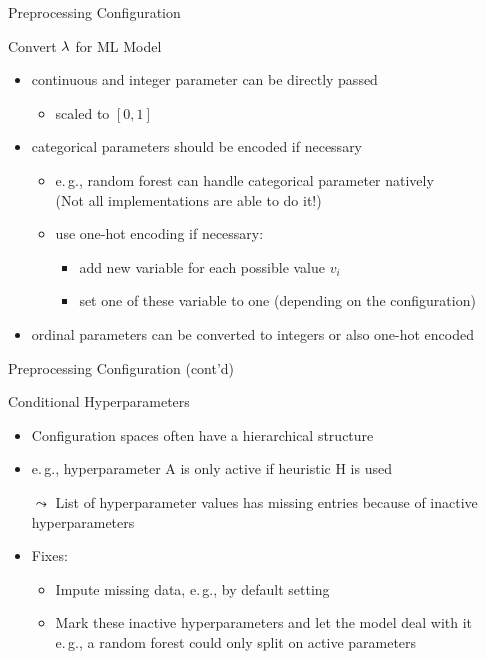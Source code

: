 \begin{frame}[c]{Preprocessing Configuration}

\begin{block}{Convert $\mathbf{\lambda}$ for ML Model}
  \begin{itemize}
    \item continuous and integer parameter can be directly passed
    \begin{itemize}
      \item scaled to $[0,1]$
    \end{itemize}
    \pause
    \item categorical parameters should be encoded if necessary
    \begin{itemize}
      \item e.$\,$g., random forest can handle categorical parameter natively\\
      (Not all implementations are able to do it!) 
      \item use one-hot encoding if necessary:
      \begin{itemize}
        \item add new variable for each possible value $v_i$
        \item set one of these variable to one (depending on the configuration)
      \end{itemize}
    \end{itemize}
    \pause
    \item ordinal parameters can be converted to integers or also one-hot encoded
  \end{itemize}
\end{block}


\end{frame}
\begin{frame}[c]{Preprocessing Configuration (cont'd)}

\begin{block}{Conditional Hyperparameters}
  \begin{itemize}
    \item Configuration spaces often have a hierarchical structure
    \item e.$\,$g., hyperparameter A is only active if heuristic H is used
    \pause
    \item[$\leadsto$] List of hyperparameter values has missing entries because of inactive hyperparameters
    \medskip
    \pause
    \item Fixes:
    \begin{itemize}
    	\item Impute missing data, e.$\,$g., by default setting
    	\item Mark these inactive hyperparameters and let the model deal with it\\
    		  e.$\,$g., a random forest could only split on active parameters
    \end{itemize}
  \end{itemize}
\end{block}

\end{frame}
